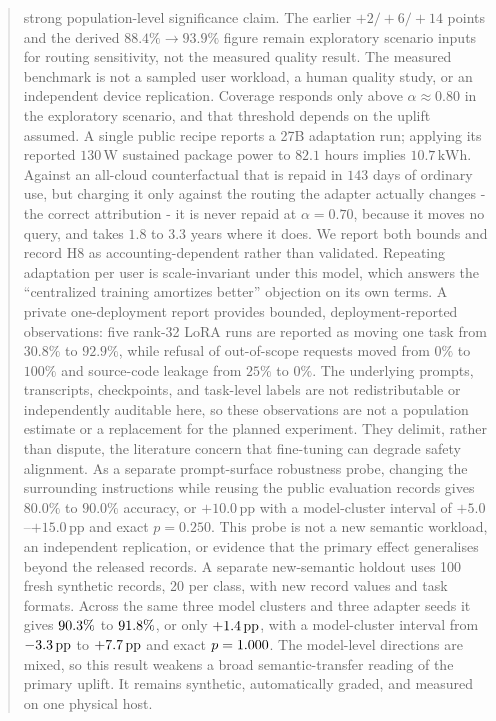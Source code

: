 \documentclass[conference]{IEEEtran}
\newcommand{\kWh}{\,\text{kWh}}
\newcommand{\pp}{\,\text{pp}}
\begin{document}
\begin{abstract}
strong population-level significance claim. The earlier $+2/+6/+14$ points
and the derived $88.4\% \rightarrow 93.9\%$ figure remain exploratory
scenario inputs for routing sensitivity, not the measured quality result. The
measured benchmark is not a sampled user workload, a human quality study, or
an independent device replication. Coverage responds only above
$\alpha \approx 0.80$ in the exploratory scenario, and that threshold depends
on the uplift assumed. A single public recipe reports a 27B adaptation run;
applying its reported $130$\,W sustained package power to $82.1$ hours implies
$10.7\kWh$. Against an all-cloud counterfactual that is repaid in $143$ days of
ordinary use, but charging it only against the routing the adapter actually
changes - the correct attribution - it is never repaid at $\alpha = 0.70$,
because it moves no query, and takes $1.8$ to $3.3$ years where it does. We
report both bounds and record H8 as accounting-dependent rather than
validated. Repeating adaptation per user is scale-invariant under this model,
which answers the ``centralized training amortizes better'' objection on its own
terms. A private one-deployment report provides bounded, deployment-reported
observations: five rank-32 LoRA runs are reported as moving one task from
$30.8\%$ to $92.9\%$, while refusal of out-of-scope requests moved from $0\%$
to $100\%$ and source-code leakage from $25\%$ to $0\%$. The underlying
prompts, transcripts, checkpoints, and task-level labels are not redistributable
or independently auditable here, so these observations are not a population
estimate or a replacement for the planned experiment. They delimit, rather
than dispute, the literature concern that fine-tuning can degrade safety
alignment.
As a separate prompt-surface robustness probe, changing the surrounding
instructions while reusing the public evaluation records gives $80.0\%$ to
$90.0\%$ accuracy, or $+10.0\pp$ with a model-cluster interval of
$+5.0$--$+15.0\pp$ and exact $p=0.250$. This probe is not a new semantic
workload, an independent replication, or evidence that the primary effect
generalises beyond the released records.
A separate new-semantic holdout uses 100 fresh synthetic records, 20 per
class, with new record values and task formats. Across the same three model
clusters and three adapter seeds it gives $\AdaptationSemanticBaseAccuracy\%$
to $\AdaptationSemanticAdaptedAccuracy\%$, or only
$+\AdaptationSemanticUplift\pp$, with a model-cluster interval from
$\AdaptationSemanticUpliftLow\pp$ to
$+\AdaptationSemanticUpliftHigh\pp$ and exact $p=\AdaptationSemanticClusterP$.
The model-level directions are mixed, so this result weakens a broad
semantic-transfer reading of the primary uplift. It remains synthetic,
automatically graded, and measured on one physical host.
\end{abstract}
\end{document}
